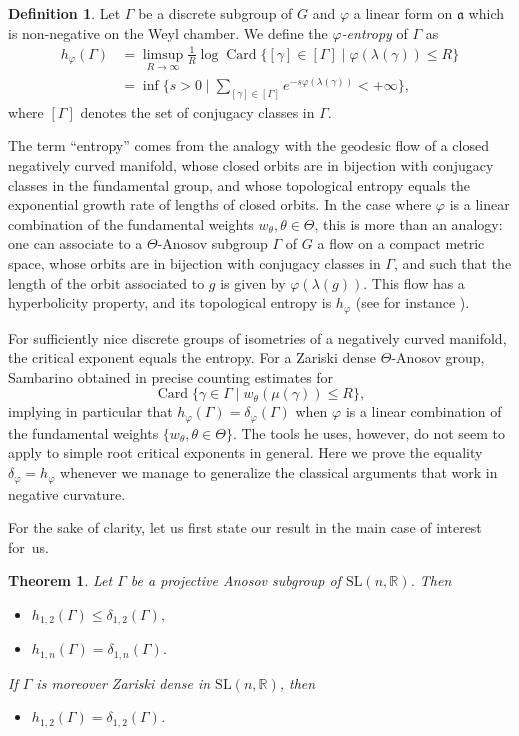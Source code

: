 \documentclass[11pt]{article}
\numberwithin{equation}{section}
\newtheorem{theorem}[theo]{Theorem}
\theoremstyle{definition}
\newtheorem{defi}[theo]{Definition}
\newcommand{\R}{\mathbb{R}}
\newcommand{\SL}{\mathrm{SL}}
\newcommand{\fa}{\mathfrak{a}}
\DeclareMathOperator{\Card}{Card}
\let\phi\varphi
\let\G\Gamma
\let\g\gamma
\begin{document}
\begin{defi} \label{def - entropy}
Let $\G$ be a discrete subgroup of $G$ and $\varphi$ a linear form on $\fa$ which is non-negative on the Weyl chamber. We define the \emph{$\varphi$-entropy} of $\G$ as
\begin{align*}
h_\varphi(\G) &= \limsup_{R\to \infty} \frac{1}{R} \log \Card \{ [\g] \in [\G] \mid \varphi(\lambda(\g)) \leq R\} \\
&\textstyle= \inf\bigl\{s>0\mid \sum_{[\g]\in [\G]} e^{-s\varphi(\lambda(\g))} < +\infty\bigr\},
\end{align*}
where $[\G]$ denotes the set of conjugacy classes in $\G$.
\end{defi}

The term ``entropy'' comes from the analogy with the geodesic flow of a closed negatively curved manifold, whose closed orbits are in bijection with conjugacy classes in the fundamental group, and whose topological entropy equals the exponential growth rate of lengths of closed orbits. In the case where $\phi$ is a linear combination of the fundamental weights $w_\theta, \theta \in \Theta$, this is more than an analogy: one can associate to a $\Theta$-Anosov subgroup $\Gamma$ of $G$ a flow on a compact metric space, whose orbits are in bijection with conjugacy classes in $\Gamma$, and such that the length of the orbit associated to $g$ is given by $\phi(\lambda(g))$. This flow has a hyperbolicity property, and its topological entropy is $h_\phi$ (see for instance \cite{sambarino2014quantitative}).

For sufficiently nice discrete groups of isometries of a negatively curved manifold, the critical exponent equals the entropy. For a Zariski dense $\Theta$-Anosov group, Sambarino obtained in \cite{sambarino2014quantitative} precise counting estimates for
\[\Card \{\gamma \in \Gamma \mid w_\theta(\mu(\gamma))\leq R\},\]
implying in particular that $h_\phi(\Gamma) = \delta_\phi(\Gamma)$ when $\phi$ is a linear combination of the fundamental weights $\{w_\theta,\theta \in \Theta\}$. The tools he uses, however, do not seem to apply to simple root critical exponents in general. Here we prove the equality $\delta_\phi = h_\phi$ whenever we manage to generalize the classical arguments that work in negative curvature.

For the sake of clarity, let us first state our result in the main case of interest for~us.

\begin{theorem}\label{theo-specialcaseSL(n,R)}
Let $\Gamma$ be a projective Anosov subgroup of $\SL(n,\R)$. Then
\begin{itemize}
\item $h_{1,2}(\Gamma)\leq \delta_{1,2}(\Gamma),$
\item $h_{1,n}(\Gamma)= \delta_{1,n}(\Gamma).$
\end{itemize}
If $\G$ is moreover Zariski dense in $\SL(n,\R)$, then
\begin{itemize}
\item $h_{1,2}(\Gamma) = \delta_{1,2}(\Gamma)$.
\end{itemize}
\end{theorem}
\end{document}
